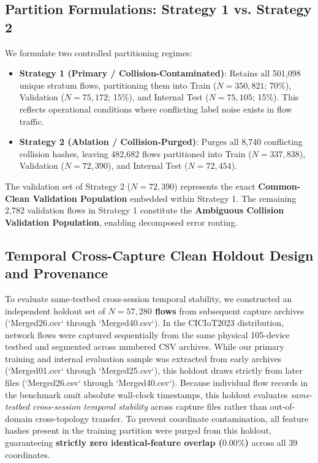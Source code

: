 \documentclass[conference,10pt,twocolumn]{IEEEtran}
\begin{document}
\subsection{Partition Formulations: Strategy 1 vs. Strategy 2}
We formulate two controlled partitioning regimes:
\begin{itemize}
    \item \textbf{Strategy 1 (Primary / Collision-Contaminated)}: Retains all 501,098 unique stratum flows, partitioning them into Train ($N = 350,821$; 70\%), Validation ($N = 75,172$; 15\%), and Internal Test ($N = 75,105$; 15\%). This reflects operational conditions where conflicting label noise exists in flow traffic.
    \item \textbf{Strategy 2 (Ablation / Collision-Purged)}: Purges all 8,740 conflicting collision hashes, leaving 482,682 flows partitioned into Train ($N = 337,838$), Validation ($N = 72,390$), and Internal Test ($N = 72,454$).
\end{itemize}

The validation set of Strategy 2 ($N = 72,390$) represents the exact \textbf{Common-Clean Validation Population} embedded within Strategy 1. The remaining 2,782 validation flows in Strategy 1 constitute the \textbf{Ambiguous Collision Validation Population}, enabling decomposed error routing.

\subsection{Temporal Cross-Capture Clean Holdout Design and Provenance}
To evaluate same-testbed cross-session temporal stability, we constructed an independent holdout set of \textbf{$N = 57,280$ flows} from subsequent capture archives (`Merged26.csv` through `Merged40.csv`). In the CICIoT2023 distribution, network flows were captured sequentially from the same physical 105-device testbed and segmented across numbered CSV archives. While our primary training and internal evaluation sample was extracted from early archives (`Merged01.csv` through `Merged25.csv`), this holdout draws strictly from later files (`Merged26.csv` through `Merged40.csv`). Because individual flow records in the benchmark omit absolute wall-clock timestamps, this holdout evaluates \textit{same-testbed cross-session temporal stability} across capture files rather than out-of-domain cross-topology transfer. To prevent coordinate contamination, all feature hashes present in the training partition were purged from this holdout, guaranteeing \textbf{strictly zero identical-feature overlap ($0.00\%$)} across all 39 coordinates.
\end{document}
